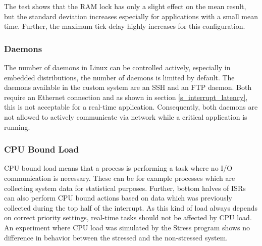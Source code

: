 The test shows that the \ac{RAM} lock has only a slight effect on the mean result, but the standard deviation increases especially for applications with a small mean time. 
Further, the maximum tick delay highly increases for this configuration.

\subsubsection{Daemons}
The number of daemons in Linux can be controlled actively, especially in embedded distributions, the number of daemons is limited by default.
The daemons available in the custom system are an \ac{SSH} and an \ac{FTP} daemon.
Both require an Ethernet connection and as shown in section \ref{s_interrupt_latency}, this is not acceptable for a real-time application.
Consequently, both daemons are not allowed to actively communicate via network while a critical application is running.

\subsubsection{CPU Bound Load}
\ac{CPU} bound load means that a process is performing a task where no \ac{I/O} communication is necessary.
These can be for example processes which are collecting system data for statistical purposes. 
Further, bottom halves of \acp{ISR} can also perform \ac{CPU} bound actions based on data which was previously collected during the top half of the interrupt.
As this kind of load always depends on correct priority settings, real-time tasks should not be affected by \ac{CPU} load. 
An experiment where \ac{CPU} load was simulated by the Stress program shows no difference in behavior between the stressed and the non-stressed system.


